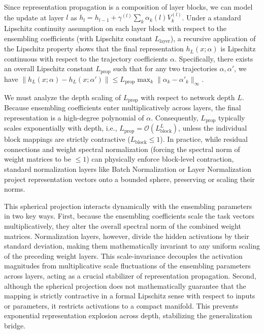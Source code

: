Since representation propagation is a composition of layer blocks, we can model the update at layer $l$ as $h_l = h_{l-1} + \gamma^{(l)} \sum_k \alpha_k(l) V_k^{(l)}$. Under a standard Lipschitz continuity assumption on each layer block with respect to the ensembling coefficients (with Lipschitz constant $L_{\text{layer}}$), a recursive application of the Lipschitz property shows that the final representation $h_L(x; \alpha)$ is Lipschitz continuous with respect to the trajectory coefficients $\alpha$. Specifically, there exists an overall Lipschitz constant $L_{\text{prop}}$ such that for any two trajectories $\alpha, \alpha'$, we have $\|h_L(x; \alpha) - h_L(x; \alpha')\| \le L_{\text{prop}} \max_k \|\alpha_k - \alpha'_k\|_\infty$.

We must analyze the depth scaling of $L_{\text{prop}}$ with respect to network depth $L$. Because ensembling coefficients enter multiplicatively across layers, the final representation is a high-degree polynomial of $\alpha$. Consequently, $L_{\text{prop}}$ typically scales exponentially with depth, i.e., $L_{\text{prop}} = \mathcal{O}(L_{\text{block}}^L)$, unless the individual block mappings are strictly contractive ($L_{\text{block}} \le 1$). In practice, while residual connections and weight spectral normalization (forcing the spectral norm of weight matrices to be $\le 1$) can physically enforce block-level contraction, standard normalization layers like Batch Normalization or Layer Normalization project representation vectors onto a bounded sphere, preserving or scaling their norms. 

This spherical projection interacts dynamically with the ensembling parameters in two key ways. First, because the ensembling coefficients scale the task vectors multiplicatively, they alter the overall spectral norm of the combined weight matrices. Normalization layers, however, divide the hidden activations by their standard deviation, making them mathematically invariant to any uniform scaling of the preceding weight layers. This scale-invariance decouples the activation magnitudes from multiplicative scale fluctuations of the ensembling parameters across layers, acting as a crucial stabilizer of representation propagation. Second, although the spherical projection does not mathematically guarantee that the mapping is strictly contractive in a formal Lipschitz sense with respect to inputs or parameters, it restricts activations to a compact manifold. This prevents exponential representation explosion across depth, stabilizing the generalization bridge.

